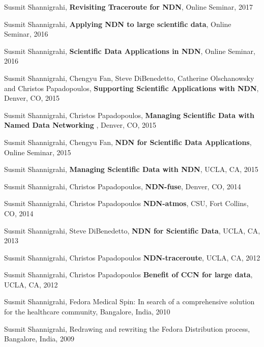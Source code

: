 \begin{etaremune}
\item   Susmit Shannigrahi, \textbf{Revisiting Traceroute for NDN}, Online Seminar, 2017

\item Susmit Shannigrahi, \textbf{Applying NDN to large scientific data}, Online Seminar, 2016

\item Susmit Shannigrahi, \textbf{Scientific Data Applications in NDN}, Online Seminar, 2016

\item Susmit Shannigrahi, Chengyu Fan, Steve DiBenedetto, Catherine Olschanowsky and Christos Papadopoulos, \textbf{Supporting Scientific Applications with NDN}, Denver, CO, 2015

\item Susmit Shannigrahi, Christos Papadopoulos, \textbf{Managing Scientific Data with Named Data Networking }, Denver, CO, 2015

\item Susmit Shannigrahi, Chengyu Fan, \textbf{NDN for Scientific Data Applications}, Online Seminar, 2015

\item Susmit Shannigrahi, \textbf{Managing Scientific Data with NDN}, UCLA, CA, 2015

\item Susmit Shannigrahi, Christos Papadopoulos, \textbf{NDN-fuse}, Denver, CO, 2014

\item  Susmit Shannigrahi, Christos Papadopoulos \textbf{NDN-atmos}, CSU, Fort Collins, CO, 2014

\item  Susmit Shannigrahi, Steve DiBenedetto, \textbf{NDN for Scientific Data}, UCLA, CA, 2013

\item  Susmit Shannigrahi, Christos Papadopoulos \textbf{NDN-traceroute}, UCLA, CA, 2012

\item Susmit Shannigrahi, Christos Papadopoulos \textbf{Benefit of CCN for large data}, UCLA, CA, 2012

\item Susmit Shannigrahi, Fedora Medical Spin: In search of a comprehensive solution for the healthcare community, Bangalore, India, 2010
%
\item Susmit Shannigrahi, {Redrawing and rewriting the Fedora Distribution process}, Bangalore, India, 2009

\end{etaremune}

